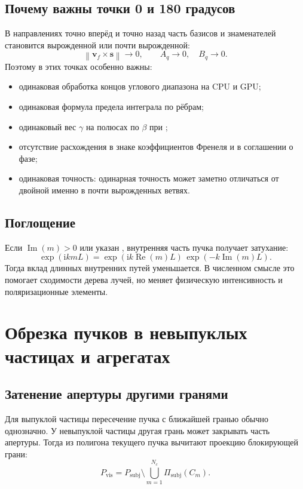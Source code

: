 \documentclass[11pt,a4paper]{article}
\newcommand{\code}[1]{\texttt{\small\detokenize{#1}}}
\newcommand{\vect}[1]{\symbf{#1}}
\newcommand{\ii}{\mathrm{i}}
\newcommand{\Real}{\operatorname{Re}}
\newcommand{\Imag}{\operatorname{Im}}
\newcommand{\norm}[1]{\left\lVert #1 \right\rVert}
\begin{document}
\subsection{Почему важны точки 0 и 180 градусов}

В направлениях точно вперёд и точно назад часть базисов и знаменателей
становится вырожденной или почти вырожденной:
\[
  \norm{\vect v_f\times\vect s}\to0,
  \qquad
  A_q\to0,\quad B_q\to0.
\]
Поэтому в этих точках особенно важны:
\begin{itemize}[leftmargin=1.4em]
  \item одинаковая обработка концов углового диапазона на CPU и GPU;
  \item одинаковая формула предела интеграла по рёбрам;
  \item одинаковый вес $\gamma$ на полюсах по $\beta$ при \code{--pole};
  \item отсутствие расхождения в знаке коэффициентов Френеля и в соглашении о
    фазе;
  \item одинаковая точность: одинарная точность может заметно отличаться от
    двойной именно в почти вырожденных ветвях.
\end{itemize}

\subsection{Поглощение}

Если $\Imag(m)>0$ или указан \code{--abs}, внутренняя часть пучка получает затухание:
\[
  \exp(\ii k m L)
  =
  \exp(\ii k \Real(m)L)\,
  \exp(-k\Imag(m)L).
\]
Тогда вклад длинных внутренних путей уменьшается. В численном смысле это помогает сходимости дерева лучей, но меняет физическую интенсивность и поляризационные элементы.

\section{Обрезка пучков в невыпуклых частицах и агрегатах}

\subsection{Затенение апертуры другими гранями}

Для выпуклой частицы пересечение пучка с ближайшей гранью обычно однозначно.
У невыпуклой частицы другая грань может закрывать часть апертуры. Тогда из
полигона текущего пучка вычитают проекцию блокирующей грани:
\[
  P_{\mathrm{vis}}
  =
  P_{\mathrm{subj}}
  \setminus
  \bigcup_{m=1}^{N_c}
  \Pi_{\mathrm{subj}}(C_m).
\]
\end{document}
